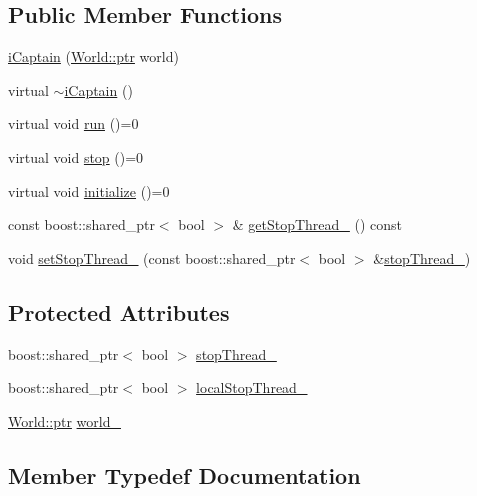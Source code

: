 \subsection*{Public Member Functions}
\begin{DoxyCompactItemize}
\item 
\hyperlink{classo_cpt_1_1i_captain_a23cd0cb920d48da605e9c8266e6448a9}{i\+Captain} (\hyperlink{classo_cpt_1_1_world_aa6e591e3096d5de71e0cec9039663d67}{World\+::ptr} world)
\item 
virtual \hyperlink{classo_cpt_1_1i_captain_a32e37b6a4952f59c1b315d54bf84bb3f}{$\sim$i\+Captain} ()
\item 
virtual void \hyperlink{classo_cpt_1_1i_captain_a53d61f2d68b435f32ad66858ae898763}{run} ()=0
\item 
virtual void \hyperlink{classo_cpt_1_1i_captain_aeda385ea9a0ee33301dfda05098c836b}{stop} ()=0
\item 
virtual void \hyperlink{classo_cpt_1_1i_captain_a5ad7947dde7866981c76ccd3a30ce4ce}{initialize} ()=0
\item 
const boost\+::shared\+\_\+ptr$<$ bool $>$ \& \hyperlink{classo_cpt_1_1i_captain_a04b0e2bea118a3e7dde86d3f5d419905}{get\+Stop\+Thread\+\_\+} () const 
\item 
void \hyperlink{classo_cpt_1_1i_captain_ad430c275b858faa6eee0be6cc0c8ea26}{set\+Stop\+Thread\+\_\+} (const boost\+::shared\+\_\+ptr$<$ bool $>$ \&\hyperlink{classo_cpt_1_1i_captain_a867451cb05e5073d61c0b6a2d0e7389c}{stop\+Thread\+\_\+})
\end{DoxyCompactItemize}
\subsection*{Protected Attributes}
\begin{DoxyCompactItemize}
\item 
boost\+::shared\+\_\+ptr$<$ bool $>$ \hyperlink{classo_cpt_1_1i_captain_a867451cb05e5073d61c0b6a2d0e7389c}{stop\+Thread\+\_\+}
\item 
boost\+::shared\+\_\+ptr$<$ bool $>$ \hyperlink{classo_cpt_1_1i_captain_aaa8f3eba679429337bc7078a8c1a45ac}{local\+Stop\+Thread\+\_\+}
\item 
\hyperlink{classo_cpt_1_1_world_aa6e591e3096d5de71e0cec9039663d67}{World\+::ptr} \hyperlink{classo_cpt_1_1i_captain_a6e08906c347d5fc66605bfde73046194}{world\+\_\+}
\end{DoxyCompactItemize}


\subsection{Member Typedef Documentation}
